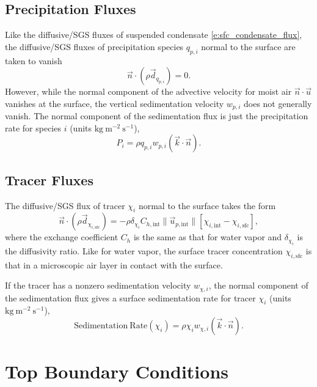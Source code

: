 \documentclass{report}
\begin{document}
\subsection{Precipitation Fluxes}

Like the diffusive/SGS fluxes of suspended condensate \eqref{e:sfc_condensate_flux}, the diffusive/SGS fluxes of precipitation species $q_{p, i}$ normal to the surface are taken to vanish
\begin{equation}\label{e:sfc_precip}
 \vec{n} \cdot (\rho \vec{d}_{q_{p, i}}) = 0.
\end{equation} 
However, while the normal component of the advective velocity for moist air $\vec{n} \cdot \vec{u}$ vanishes at the surface, the vertical sedimentation velocity $w_{p,i}$ does not generally vanish. The normal component of the sedimentation flux is just the precipitation rate for species $i$ (units $\mathrm{kg~m^{-2}~s^{-1}}$),
\begin{equation}
    P_i = \rho q_{p, i} w_{p, i} (\vec{k} \cdot \vec{n}).
\end{equation}

\subsection{Tracer Fluxes}

The diffusive/SGS flux of tracer $\chi_i$ normal to the surface takes the form 
\begin{equation}\label{e:sfc_tracer}
 \vec{n} \cdot (\rho \vec{d}_{\chi_{i, \mathrm{sfc}}}) = - \rho \delta_{\chi_i} C_{h, \mathrm{int}} \| \vec{u}_{p, \mathrm{int}} \| \left[\chi_{i, \mathrm{int}} - \chi_{i, \mathrm{sfc}} \right],
\end{equation} 
where the exchange coefficient $C_h$ is the same as that for water vapor and $\delta_{\chi_i}$ is the diffusivity ratio. Like for water vapor, the surface tracer concentration $\chi_{i, \mathrm{sfc}}$ is that in a microscopic air layer in contact with the surface.

If the tracer has a nonzero sedimentation velocity $w_{\chi, i}$, the normal component of the sedimentation flux gives a surface sedimentation rate for tracer $\chi_i$ (units $\mathrm{kg~m^{-2}~s^{-1}}$),
\begin{equation}
    \mathrm{Sedimentation~Rate}(\chi_i) = \rho \chi_{i} w_{\chi, i} (\vec{k} \cdot \vec{n}).
\end{equation}

\section{Top Boundary Conditions} 
\end{document}
